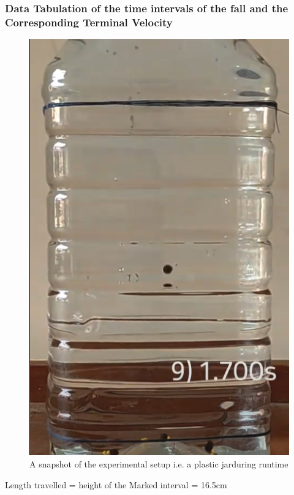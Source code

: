 \documentclass[twocolumn,11pt]{article}
\begin{document}
\subsubsection{Data Tabulation of the time intervals of the fall and the Corresponding Terminal Velocity}
\begin{figure}[H]
    \centering
    \includegraphics[scale= 0.5]{Terminal_pepper.png}
    \caption{A snapshot of the experimental setup i.e. a plastic jar\protect\footnotemark during runtime}
    \label{A snapshot of the experimental setup during runtime}
\end{figure}
Length travelled = height of the Marked interval = 16.5cm\\
\end{document}
